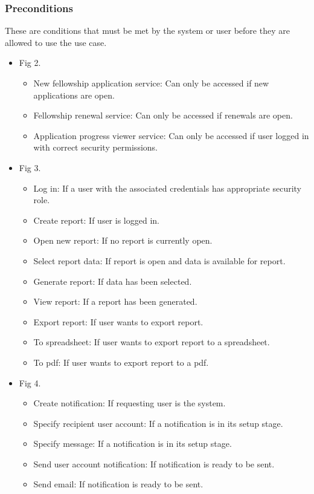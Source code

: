 \documentclass[12pt]{article}
\begin{document}
\subsubsection{Preconditions}
These are conditions that must be met by the system or user before they are allowed to use the use case.\\
\begin{itemize}
	\item Fig 2.
	\begin{itemize}
		\item New fellowship application service: Can only be accessed if new applications are open.
		\item Fellowship renewal service: Can only be accessed if renewals are open.
		\item Application progress viewer service: Can only be accessed if user logged in with correct security permissions.	
	\end{itemize}
	
	\item Fig 3.
		\begin{itemize}
			\item Log in: If a user with the associated credentials has appropriate security role.
			\item Create report: If user is logged in.
			\item Open new report: If no report is currently open.
			\item Select report data: If report is open and data is available for report.
			\item Generate report: If data has been selected.
			\item View report: If a report has been generated.
			\item Export report: If user wants to export report.
			\item To spreadsheet: If user wants to export report to a spreadsheet.
			\item To pdf: If user wants to export report to a pdf.	
		\end{itemize}
	
	\item Fig 4.
			\begin{itemize}
				\item Create notification: If requesting user is the system.
				\item Specify recipient user account: If a notification is in its setup stage.				
				\item Specify message: If a notification is in its setup stage.
				\item Send user account notification: If notification is ready to be sent.
				\item Send email: If notification is ready to be sent.	
			\end{itemize}
	

\end{itemize}
\end{document}
